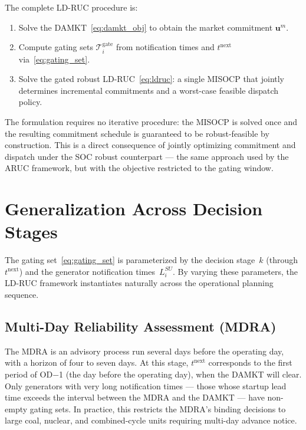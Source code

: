 \documentclass[journal]{IEEEtran}
\begin{document}
The complete LD-RUC procedure is:
\begin{enumerate}
  \item Solve the DAMKT~\eqref{eq:damkt_obj} to obtain the market
    commitment $\mathbf{u}^m$.
  \item Compute gating sets $\mathcal{T}_i^{\text{gate}}$ from
    notification times and $t^{\text{next}}$
    via~\eqref{eq:gating_set}.
  \item Solve the gated robust LD-RUC~\eqref{eq:ldruc}: a single
    MISOCP that jointly determines incremental commitments and a
    worst-case feasible dispatch policy.
\end{enumerate}

The formulation requires no iterative procedure: the MISOCP is
solved once and the resulting commitment schedule is guaranteed to be
robust-feasible by construction.
This is a direct consequence of jointly optimizing commitment and
dispatch under the SOC robust counterpart --- the same approach used
by the ARUC framework, but with the objective restricted to the
gating window.


\section{Generalization Across Decision Stages}\label{sec:general}

The gating set~\eqref{eq:gating_set} is parameterized by the
decision stage~$k$ (through $t^{\text{next}}$) and the generator
notification times~$L_i^{SU}$.
By varying these parameters, the LD-RUC framework instantiates
naturally across the operational planning sequence.

\subsection{Multi-Day Reliability Assessment (MDRA)}

The MDRA is an advisory process run several days before the operating
day, with a horizon of four to seven days.
At this stage, $t^{\text{next}}$ corresponds to the first period of
OD$-$1 (the day before the operating day), when the DAMKT will
clear.
Only generators with very long notification times --- those whose
startup lead time exceeds the interval between the MDRA and the
DAMKT --- have non-empty gating sets.
In practice, this restricts the MDRA's binding decisions to large
coal, nuclear, and combined-cycle units requiring multi-day advance
notice.
\end{document}
